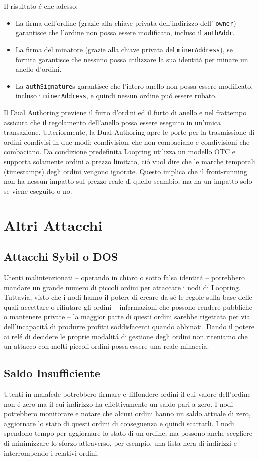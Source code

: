 \documentclass[UTF8,nofonts]{article}
\begin{document}
\begin{multicols}{2}
\begin{enumerate}
\end{enumerate}
Il risultato \'e che adesso:
\begin{itemize}
	\item  La firma dell'ordine (grazie alla chiave privata dell'indirizzo dell' \verb|owner|) garantisce che l'ordine non possa essere modificato, incluso il \verb|authAddr|.
	\item  La firma del minatore (grazie alla  chiave privata del \verb|minerAddress|), se fornita garantisce che nessuno possa utilizzare la sua identit\'a per minare un anello d'ordini.
	\item  La \verb|authSignature|s garantisce che l'intero anello non possa essere modificato, incluso i \verb|minerAddress|, e quindi nessun ordine pu\'o essere rubato.
\end{itemize}
Il Dual Authoring previene il furto d'ordini ed il furto di anello e nel frattempo assicura che il regolamento dell'anello possa essere eseguito in un'unica transazione. Ulteriormente, la Dual Authoring apre le porte per la trasmissione di ordini condivisi in due modi: condivisioni che non combaciano e condivisioni che combaciano.  Da condizione predefinita Loopring utilizza un modello OTC e supporta solamente ordini a prezzo limitato, ci\'o vuol dire che le marche temporali (timestamps) degli ordini vengono ignorate. Questo implica che il front-running non ha nessun impatto sul prezzo reale di quello scambio, ma ha un impatto solo se viene eseguito o no.
\section{Altri Attacchi}
\subsection{Attacchi Sybil o DOS}
Utenti malintenzionati -- operando in chiaro o sotto falsa identit\'a -- potrebbero mandare un grande numero di piccoli ordini per attaccare i nodi di Loopring. Tuttavia, visto che i nodi hanno il potere di creare da s\'e le regole sulla base delle quali accettare o rifiutare gli ordini -- informazioni che possono rendere pubbliche o mantenere private -- la maggior parte di questi ordini sarebbe rigettata per via dell'incapacit\'a di produrre profitti soddisfacenti quando abbinati. Dando il potere ai rel\'e di decidere le proprie modalit\'a di gestione degli ordini non riteniamo che un attacco con molti piccoli ordini possa essere una reale minaccia.
\subsection{Saldo Insufficiente}
Utenti in malafede potrebbero firmare e diffondere ordini il cui valore dell'ordine non \'e zero ma il cui indirizzo ha effettivamente un saldo pari a zero. I nodi potrebbero monitorare e notare che alcuni ordini hanno un saldo attuale di zero, aggiornare lo stato di questi ordini di conseguenza e quindi scartarli.
I nodi spendono tempo per aggiornare lo stato di un ordine, ma possono anche scegliere di minimizzare lo sforzo attraverso, per esempio, una lista nera di indirizzi e interrompendo i relativi ordini.

\end{multicols}
\end{document}
